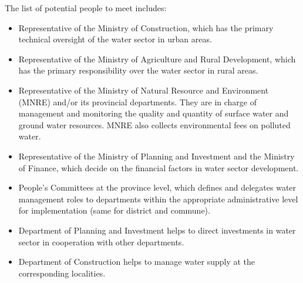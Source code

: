 \documentclass[11pt,english]{article}
\theoremstyle{plain} \newtheorem{claim}{Claim}
\theoremstyle{plain} \newtheorem{prop}{Proposition}
\theoremstyle{plain} \newtheorem{hypo}{Hypothesis}
\begin{document}
The list of potential people to meet includes: 
\begin{itemize}
\item	Representative of the Ministry of Construction, which has the primary technical oversight of the water sector in urban areas. 
\item	Representative of the Ministry of Agriculture and Rural Development, which has the primary responsibility over the water sector in rural areas. 
\item	Representative of the Ministry of Natural Resource and Environment (MNRE) and/or its provincial departments. They are in charge of management and monitoring the quality and quantity of surface water and ground water resources. MNRE also collects environmental fees on polluted water. 
\item	Representative of the Ministry of Planning and Investment and the Ministry of Finance, which decide on the financial factors in water sector development. 
\item	People's Committees at the province level, which defines and delegates water management roles to departments within the appropriate administrative level for implementation (same for district and commune). 
\item	Department of Planning and Investment helps to direct investments in water sector in cooperation with other departments.
\item	Department of Construction helps to manage water supply at the corresponding localities. 
\end{itemize}

\clearpage



\end{document}
